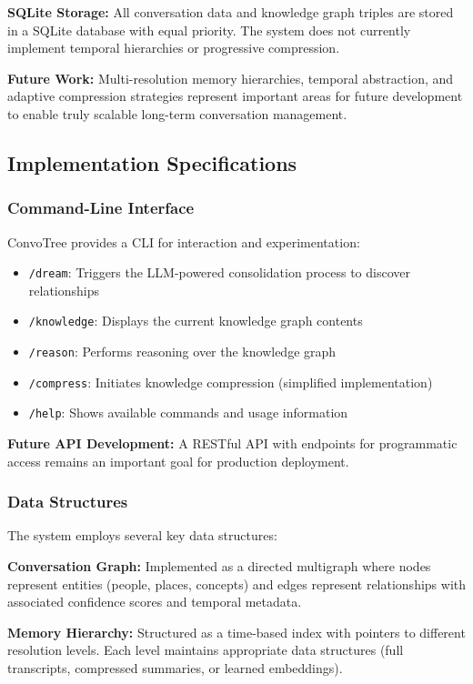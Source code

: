 \documentclass[11pt]{article}
\begin{document}
\textbf{SQLite Storage:} All conversation data and knowledge graph triples are stored in a SQLite database with equal priority. The system does not currently implement temporal hierarchies or progressive compression.

\textbf{Future Work:} Multi-resolution memory hierarchies, temporal abstraction, and adaptive compression strategies represent important areas for future development to enable truly scalable long-term conversation management.

\subsection{Implementation Specifications}

\subsubsection{Command-Line Interface}
ConvoTree provides a CLI for interaction and experimentation:

\begin{itemize}
\item \texttt{/dream}: Triggers the LLM-powered consolidation process to discover relationships
\item \texttt{/knowledge}: Displays the current knowledge graph contents
\item \texttt{/reason}: Performs reasoning over the knowledge graph
\item \texttt{/compress}: Initiates knowledge compression (simplified implementation)
\item \texttt{/help}: Shows available commands and usage information
\end{itemize}

\textbf{Future API Development:} A RESTful API with endpoints for programmatic access remains an important goal for production deployment.

\subsubsection{Data Structures}
The system employs several key data structures:

\textbf{Conversation Graph:} Implemented as a directed multigraph where nodes represent entities (people, places, concepts) and edges represent relationships with associated confidence scores and temporal metadata.

\textbf{Memory Hierarchy:} Structured as a time-based index with pointers to different resolution levels. Each level maintains appropriate data structures (full transcripts, compressed summaries, or learned embeddings).
\end{document}
